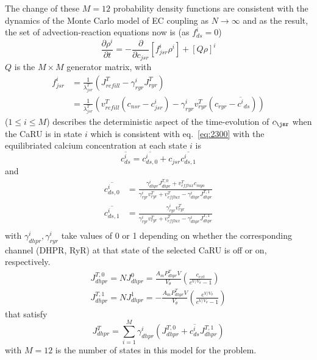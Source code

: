 The change of these $M=12$ probability density functions are
consistent with the dynamics of the Monte Carlo model of EC coupling
as $N\rightarrow \infty$ and as the result, the set of
advection-reaction equations now is (as $f^i_{ds}=0$)
\begin{equation}
  \label{eq:203}
  \frac{\partial \rho^{i}}{\partial t} = -\frac{\partial}{\partial
    c_{jsr}}[f^{i}_{jsr}\rho^{i}] + [Q\rho ]^i
\end{equation}
$Q$ is the $M \times M$ generator matrix, with
\begin{equation}
  \label{eq:213}
  \begin{split}
    f^i_{jsr} &= \frac{1}{\lambda^T_{jsr}} \left(J^T_{refill}
      - \gamma^i_{ryr}J^T_{ryr}  \right)  \\
    &=  \frac{1}{\lambda^T_{jsr}} \left(v^T_{refill}(c_{nsr}-c^i_{jsr})
      - \gamma^i_{ryr} v^T_{ryr}(c_{ryr}-\overline{c^i}_{ds})  \right)
  \end{split}
\end{equation}
($1\le i \le M$) describes the deterministic aspect of the time-evolution of
$c_\jsr$ when the CaRU is in state $i$ which is consistent with
eq.~\eqref{eq:2300} with the equilibriated calcium concentration at each state $i$ is
\begin{equation}
  \label{eq:214}
  \overline{c^i_{ds}} =   \overline{c^i_{ds,0}} + c_{jsr} \overline{c^i_{ds,1}}  
\end{equation}
and 
\begin{equation}
  \label{eq:215}
  \begin{split}
    \overline{c^i_{ds,0}} &= \frac{\gamma^i_{dhpr}J^{T,0}_{dhpr} +
      v^T_{efflux}c_{myo}}{\gamma^i_{ryr} v^T_{ryr} + v^T_{efflux} - \gamma^i_{dhpr}J^{T,1}_{dhpr}} \\
    \overline{c^i_{ds,1}} &=
    \frac{\gamma^i_{ryr}v^T_{ryr}}{\gamma^i_{ryr} v^T_{ryr} + v^T_{efflux}
      - \gamma^i_{dhpr}J^{T,1}_{dhpr}} \\
  \end{split}
\end{equation}
with $\gamma^i_{dhpr}, \gamma^i_{ryr}$ take values of 0 or 1
depending on whether the corresponding channel (DHPR, RyR) at that
state of the selected CaRU is off or on, respectively. 
\begin{equation}
  \label{eq:2071}
  \begin{split}
    J^{T,0}_{dhpr} =NJ^{0}_{dhpr}=  \frac{A_mP^T_{dhpr}V}{V_\theta} \left( \frac{c_{ext}}{e^{V/V_\theta}-1}  \right)\\
    J^{T,1}_{dhpr} =NJ^{1}_{dhpr}=  -\frac{A_mP^T_{dhpr}V}{V_\theta} \left( \frac{e^{V/V_\theta}}{e^{V/V_\theta}-1}  \right)
  \end{split}
\end{equation}
that satisfy
\begin{equation}
  \label{eq:2081}
  J^T_{dhpr} = \sum_{i=1}^M  \gamma^i_{dhpr} (J^{T,0}_{dhpr} + \overline{c^i_{ds}}  J^{T,1}_{dhpr})
\end{equation}
with $M=12$ is the number of states in this model for the problem.



